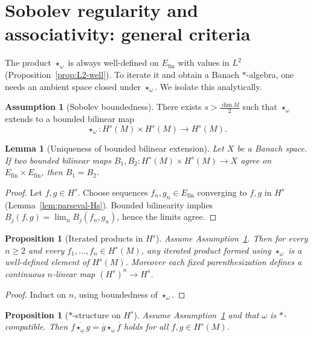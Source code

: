 \documentclass[11pt]{amsart}
\theoremstyle{plain}
\newtheorem{lemma}[theorem]{Lemma}
\newtheorem{proposition}[theorem]{Proposition}
\theoremstyle{definition}
\newtheorem{assumption}[theorem]{Assumption}
\theoremstyle{remark}
\begin{document}
\section{Sobolev regularity and associativity: general criteria}

The product $\star_\omega$ is always well-defined on $E_{\mathrm{fin}}$ with values in $L^2$ (Proposition~\ref{prop:L2-well}).
To iterate it and obtain a Banach $*$-algebra, one needs an ambient space closed under $\star_\omega$.
We isolate this analytically.

\begin{assumption}[Sobolev boundedness]\label{ass:A}
There exists $s>\frac{\dim M}{2}$ such that $\star_\omega$ extends to a bounded bilinear map
\[ \star_\omega:H^s(M)\times H^s(M)\to H^s(M). \]
\end{assumption}

\begin{lemma}[Uniqueness of bounded bilinear extension]\label{lem:unique-extension}
Let $X$ be a Banach space. If two bounded bilinear maps $B_1,B_2:H^s(M)\times H^s(M)\to X$ agree on
$E_{\mathrm{fin}}\times E_{\mathrm{fin}}$, then $B_1=B_2$.
\end{lemma}

\begin{proof}
Let $f,g\in H^s$. Choose sequences $f_n,g_n\in E_{\mathrm{fin}}$ converging to $f,g$ in $H^s$ (Lemma~\ref{lem:parseval-Hs}).
Bounded bilinearity implies $B_j(f,g)=\lim_n B_j(f_n,g_n)$, hence the limits agree.
\end{proof}

\begin{proposition}[Iterated products in $H^s$]\label{prop:iterated}
Assume Assumption~\ref{ass:A}. Then for every $n\ge 2$ and every $f_1,\dots,f_n\in H^s(M)$,
any iterated product formed using $\star_\omega$ is a well-defined element of $H^s(M)$.
Moreover each fixed parenthesization defines a continuous $n$-linear map $(H^s)^n\to H^s$.
\end{proposition}

\begin{proof}
Induct on $n$, using boundedness of $\star_\omega$.
\end{proof}

\begin{proposition}[$*$-structure on $H^s$]\label{prop:star-Hs}
Assume Assumption~\ref{ass:A} and that $\omega$ is $*$-compatible.
Then $\overline{f\star_\omega g}=\overline g\star_\omega\overline f$ holds for all $f,g\in H^s(M)$.
\end{proposition}
\end{document}
